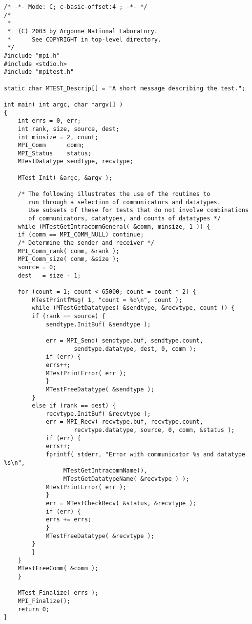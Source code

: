 \begin{verbatim}
/* -*- Mode: C; c-basic-offset:4 ; -*- */
/*
 *
 *  (C) 2003 by Argonne National Laboratory.
 *      See COPYRIGHT in top-level directory.
 */
#include "mpi.h"
#include <stdio.h>
#include "mpitest.h"

static char MTEST_Descrip[] = "A short message describing the test.";

int main( int argc, char *argv[] )
{
    int errs = 0, err;
    int rank, size, source, dest;
    int minsize = 2, count; 
    MPI_Comm      comm;
    MPI_Status    status;
    MTestDatatype sendtype, recvtype;

    MTest_Init( &argc, &argv );

    /* The following illustrates the use of the routines to 
       run through a selection of communicators and datatypes.
       Use subsets of these for tests that do not involve combinations 
       of communicators, datatypes, and counts of datatypes */
    while (MTestGetIntracommGeneral( &comm, minsize, 1 )) {
	if (comm == MPI_COMM_NULL) continue;
	/* Determine the sender and receiver */
	MPI_Comm_rank( comm, &rank );
	MPI_Comm_size( comm, &size );
	source = 0;
	dest   = size - 1;
	
	for (count = 1; count < 65000; count = count * 2) {
	    MTestPrintfMsg( 1, "count = %d\n", count );
	    while (MTestGetDatatypes( &sendtype, &recvtype, count )) {
		if (rank == source) {
		    sendtype.InitBuf( &sendtype );
		    
		    err = MPI_Send( sendtype.buf, sendtype.count, 
				    sendtype.datatype, dest, 0, comm );
		    if (err) {
			errs++;
			MTestPrintError( err );
		    }
		    MTestFreeDatatype( &sendtype );
		}
		else if (rank == dest) {
		    recvtype.InitBuf( &recvtype );
		    err = MPI_Recv( recvtype.buf, recvtype.count, 
				    recvtype.datatype, source, 0, comm, &status );
		    if (err) {
			errs++;
			fprintf( stderr, "Error with communicator %s and datatype %s\n", 
				 MTestGetIntracommName(), 
				 MTestGetDatatypeName( &recvtype ) );
			MTestPrintError( err );
		    }
		    err = MTestCheckRecv( &status, &recvtype );
		    if (err) {
			errs += errs;
		    }
		    MTestFreeDatatype( &recvtype );
		}
	    }
	}
	MTestFreeComm( &comm );
    }

    MTest_Finalize( errs );
    MPI_Finalize();
    return 0;
}
\end{verbatim}

